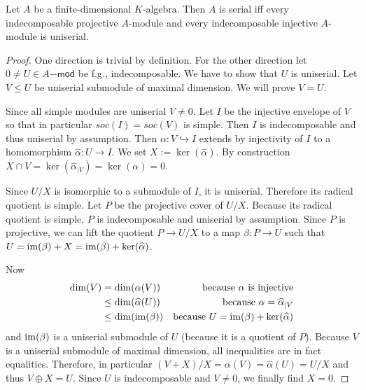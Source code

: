\documentclass[fontsize=11pt,fleqn,a4paper]{scrartcl}
\begin{document}
\begin{proposition}[11.3.6]
Let $A$ be a finite-dimensional $K$-algebra. Then $A$ is serial iff every indecomposable projective $A$-module and every indecomposable injective $A$-module is uniserial.
\end{proposition}
\begin{proof}
One direction is trivial by definition. For the other direction let $0\neq U\in A\mathsf{-mod}$ be f.g., indecomposable. We have to show that $U$ is uniserial. Let $V\leq U$ be uniserial submodule of maximal dimension.  We will prove $V=U$.

Since all simple modules are uniserial $V\neq 0$. Let $I$ be the injective envelope of $V$ so that in particular $soc(I)=soc(V)$ is simple. Then $I$ is indecomposable and thus uniserial by assumption. Then $\alpha: V\hookrightarrow I$ extends by injectivity of $I$ to a homomorphism $\widehat{\alpha}: U\to I$. We set $X:=\ker(\widehat{\alpha})$. By construction $X\cap V = \ker(\widehat{\alpha}_{|V}) = \ker(\alpha)=0$.

Since $U/X$ is isomorphic to a submodule of $I$, it is uniserial. Therefore its radical quotient is simple. Let $P$ be the projective cover of $U/X$. Because its radical quotient is simple, $P$ is indecomposable and uniserial by assumption. Since $P$ is projective, we can lift the quotient $P\to U/X$ to a map $\beta: P\to U$ such that $U=\operatorname{im}(\beta)+X=\operatorname{im}(\beta)+\ker(\widehat{\alpha})$.

Now
\begin{align*}
\dim(V) &= \dim(\alpha(V)) &\text{because $\alpha$ is injective} \\
&\leq\dim(\widehat{\alpha}(U)) &\text{because }\alpha=\widehat{\alpha}_{|V} \\
&\leq\dim(\operatorname{im}(\beta)) &\text{because }U=\operatorname{im}(\beta)+\ker(\widehat{\alpha})
\end{align*}
and $\operatorname{im}(\beta)$ is a uniserial submodule of $U$ (because it is a quotient of $P$). Because $V$ is a uniserial submodule of maximal dimension, all inequalities are in fact equalities. Therefore, in particular $(V+X)/X=\alpha(V) = \widehat{\alpha}(U) = U/X$ and thus $V\oplus X=U$. Since $U$ is indecomposable and $V\neq 0$, we finally find $X=0$.
\end{proof}
\end{document}
